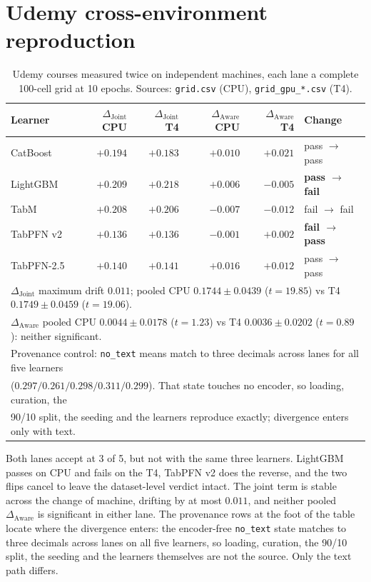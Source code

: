 \documentclass[10pt,letterpaper]{article}
\newcommand{\dj}{\Delta_{\mathrm{Joint}}}
\newcommand{\da}{\Delta_{\mathrm{Aware}}}
\begin{document}
\section{Udemy cross-environment reproduction}
\label{app:lanes}

\begin{table}[H]
\centering\small
\caption{Udemy courses measured twice on independent machines, each lane a complete 100-cell
grid at 10 epochs. Sources: \texttt{grid.csv} (CPU), \texttt{grid\_gpu\_*.csv} (T4).}
\begin{tabular}{lrrrrl}
\toprule
Learner & $\dj$ CPU & $\dj$ T4 & $\da$ CPU & $\da$ T4 & Change \\
\midrule
CatBoost   & $+0.194$ & $+0.183$ & $+0.010$ & $+0.021$ & pass $\rightarrow$ pass \\
LightGBM   & $+0.209$ & $+0.218$ & $+0.006$ & $-0.005$ & \textbf{pass $\rightarrow$ fail} \\
TabM       & $+0.208$ & $+0.206$ & $-0.007$ & $-0.012$ & fail $\rightarrow$ fail \\
TabPFN v2  & $+0.136$ & $+0.136$ & $-0.001$ & $+0.002$ & \textbf{fail $\rightarrow$ pass} \\
TabPFN-2.5 & $+0.140$ & $+0.141$ & $+0.016$ & $+0.012$ & pass $\rightarrow$ pass \\
\midrule
\multicolumn{6}{l}{$\dj$ maximum drift $0.011$; pooled CPU $0.1744 \pm 0.0439$ ($t = 19.85$) vs T4 $0.1749 \pm 0.0459$ ($t = 19.06$).} \\
\multicolumn{6}{l}{$\da$ pooled CPU $0.0044 \pm 0.0178$ ($t = 1.23$) vs T4 $0.0036 \pm 0.0202$ ($t = 0.89$): neither significant.} \\
\multicolumn{6}{l}{Provenance control: \texttt{no\_text} means match to three decimals across lanes for all five learners} \\
\multicolumn{6}{l}{($0.297 / 0.261 / 0.298 / 0.311 / 0.299$). That state touches no encoder, so loading, curation, the} \\
\multicolumn{6}{l}{90/10 split, the seeding and the learners reproduce exactly; divergence enters only with text.} \\
\bottomrule
\end{tabular}
\end{table}

\noindent Both lanes accept at 3 of 5, but not with the same three learners. LightGBM passes on CPU and
fails on the T4, TabPFN v2 does the reverse, and the two flips cancel to leave the
dataset-level verdict intact. The joint term is stable across the change of machine, drifting
by at most $0.011$, and neither pooled $\da$ is significant in either lane. The provenance rows
at the foot of the table locate where the divergence enters: the encoder-free \texttt{no\_text}
state matches to three decimals across lanes on all five learners, so loading, curation,
the 90/10 split, the seeding and
the learners themselves are not the source. Only the text path differs.
\end{document}
